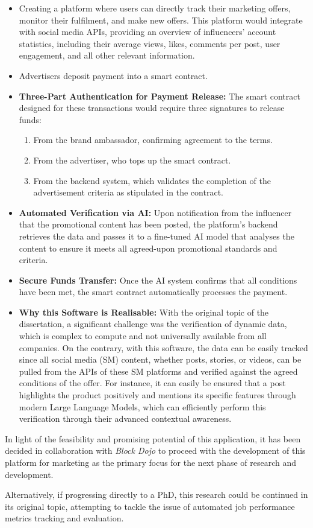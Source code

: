 \begin{itemize}
    \item Creating a platform where users can directly track their marketing offers, monitor their fulfilment, and make new offers. This platform would integrate with social media APIs, providing an overview of influencers' account statistics, including their average views, likes, comments per post, user engagement, and all other relevant information.
    \item Advertisers deposit payment into a smart contract.
    \item \textbf{Three-Part Authentication for Payment Release:} The smart contract designed for these transactions would require three signatures to release funds:
    \begin{enumerate}
        \item From the brand ambassador, confirming agreement to the terms.
        \item From the advertiser, who tops up the smart contract.
        \item From the backend system, which validates the completion of the advertisement criteria as stipulated in the contract.
    \end{enumerate}
    \item \textbf{Automated Verification via AI:} Upon notification from the influencer that the promotional content has been posted, the platform's backend retrieves the data and passes it to a fine-tuned AI model that analyses the content to ensure it meets all agreed-upon promotional standards and criteria. 
    \item \textbf{Secure Funds Transfer:} Once the AI system confirms that all conditions have been met, the smart contract automatically processes the payment.
    \item \textbf{Why this Software is Realisable:} With the original topic of the dissertation, a significant challenge was the verification of dynamic data, which is complex to compute and not universally available from all companies. On the contrary, with this software, the data can be easily tracked since all social media (SM) content, whether posts, stories, or videos, can be pulled from the APIs of these SM platforms and verified against the agreed conditions of the offer. For instance, it can easily be ensured that a post highlights the product positively and mentions its specific features through modern Large Language Models, which can efficiently perform this verification through their advanced contextual awareness.
\end{itemize}

In light of the feasibility and promising potential of this application, it has been decided in collaboration with \textit{Block Dojo} to proceed with the development of this platform for marketing as the primary focus for the next phase of research and development.

Alternatively, if progressing directly to a PhD, this research could be continued in its original topic, attempting to tackle the issue of automated job performance metrics tracking and evaluation.
